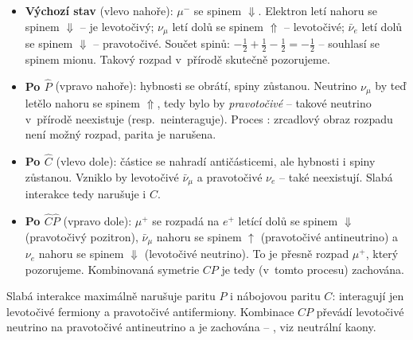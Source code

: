 \begin{center}
\end{center}
\begin{itemize}
  \item \textbf{Výchozí stav} (vlevo nahoře): $\mu^-$ se spinem $\Downarrow$. Elektron letí nahoru se spinem $\Downarrow$ -- je levotočivý; $\nu_\mu$ letí dolů se spinem $\Uparrow$ -- levotočivé; $\bar\nu_e$ letí dolů se spinem $\Downarrow$ -- pravotočivé. Součet spinů: $-\tfrac12+\tfrac12-\tfrac12=-\tfrac12$ -- souhlasí se spinem mionu. Takový rozpad v~přírodě skutečně pozorujeme.
  \item \textbf{Po $\hat P$} (vpravo nahoře): hybnosti se obrátí, spiny zůstanou. Neutrino $\nu_\mu$ by teď letělo nahoru se spinem $\Uparrow$, tedy bylo by \emph{pravotočivé} -- takové neutrino v~přírodě neexistuje (resp.\ neinteraguje). Proces : zrcadlový obraz rozpadu není možný rozpad, parita je narušena.
  \item \textbf{Po $\hat C$} (vlevo dole): částice se nahradí antičásticemi, ale hybnosti i spiny zůstanou. Vzniklo by levotočivé $\bar\nu_\mu$ a pravotočivé $\nu_e$ -- také neexistují. Slabá interakce tedy narušuje i $C$.
  \item \textbf{Po $\hat C\hat P$} (vpravo dole): $\mu^+$ se rozpadá na $e^+$ letící dolů se spinem $\Downarrow$ (pravotočivý pozitron), $\bar\nu_\mu$ nahoru se spinem $\uparrow$ (pravotočivé antineutrino) a $\nu_e$ nahoru se spinem $\Downarrow$ (levotočivé neutrino). To je přesně rozpad $\mu^+$, který pozorujeme. Kombinovaná symetrie $CP$ je tedy (v~tomto procesu) zachována.
\end{itemize}
\begin{veta}
  Slabá interakce maximálně narušuje paritu $P$ i nábojovou paritu $C$: interagují jen levotočivé fermiony a pravotočivé antifermiony. Kombinace $CP$ převádí levotočivé neutrino na pravotočivé antineutrino a je zachována -- , viz neutrální kaony.
\end{veta}

